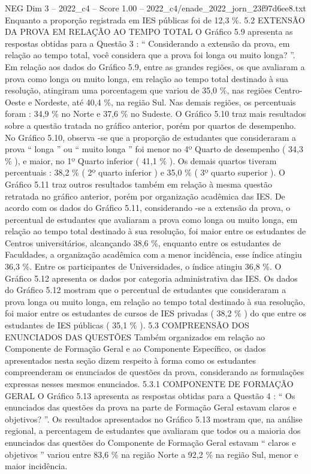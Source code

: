 \begin{textsample}{NEG Dim 3 – 2022\_c4 – Score 1.00 – 2022\_c4/enade\_2022\_jorn\_23f97d6ee8.txt}
Enquanto a proporção registrada em IES públicas foi de 12,3 \%. 5.2 EXTENSÃO DA PROVA EM RELAÇÃO AO TEMPO TOTAL O Gráfico 5.9 apresenta as respostas obtidas para a Questão 3 : “ Considerando a extensão da prova, em relação ao tempo total, você considera que a prova foi longa ou muito longa? ”.
Em relação aos dados do Gráfico 5.9, entre as grandes regiões, os que avaliaram a prova como longa ou muito longa, em relação ao tempo total destinado à sua resolução, atingiram uma porcentagem que variou de 35,0 \%, nas regiões Centro-Oeste e Nordeste, até 40,4 \%, na região Sul.
Nas demais regiões, os percentuais foram : 34,9 \% no Norte e 37,6 \% no Sudeste.
O Gráfico 5.10 traz mais resultados sobre a questão tratada no gráfico anterior, porém por quartos de desempenho.
No Gráfico 5.10, observa -se que a proporção de estudantes que consideraram a prova “ longa ” ou “ muito longa ” foi menor no 4º Quarto de desempenho ( 34,3 \% ), e maior, no 1º Quarto inferior ( 41,1 \% ).
Os demais quartos tiveram percentuais : 38,2 \% ( 2º quarto inferior ) e 35,0 \% ( 3º quarto superior ).
O Gráfico 5.11 traz outros resultados também em relação à mesma questão retratada no gráfico anterior, porém por organização acadêmica das IES.
De acordo com os dados do Gráfico 5.11, considerando -se a extensão da prova, o percentual de estudantes que avaliaram a prova como longa ou muito longa, em relação ao tempo total destinado à sua resolução, foi maior entre os estudantes de Centros universitários, alcançando 38,6 \%, enquanto entre os estudantes de Faculdades, a organização acadêmica com a menor incidência, esse índice atingiu 36,3 \%.
Entre os participantes de Universidades, o índice atingiu 36,8 \%.
O Gráfico 5.12 apresenta os dados por categoria administrativa das IES.
Os dados do Gráfico 5.12 mostram que o percentual de estudantes que consideraram a prova longa ou muito longa, em relação ao tempo total destinado à sua resolução, foi maior entre os estudantes de cursos de IES privadas ( 38,2 \% ) do que entre os estudantes de IES públicas ( 35,1 \% ). 5.3 COMPREENSÃO DOS ENUNCIADOS DAS QUESTÕES Também organizados em relação ao Componente de Formação Geral e ao Componente Específico, os dados apresentados nesta seção dizem respeito à forma como os estudantes compreenderam os enunciados de questões da prova, considerando as formulações expressas nesses mesmos enunciados. 5.3.1 COMPONENTE DE FORMAÇÃO GERAL O Gráfico 5.13 apresenta as respostas obtidas para a Questão 4 : “ Os enunciados das questões da prova na parte de Formação Geral estavam claros e objetivos? ”.
Os resultados apresentados no Gráfico 5.13 mostram que, na análise regional, a percentagem de estudantes que avaliaram que todos ou a maioria dos enunciados das questões do Componente de Formação Geral estavam “ claros e objetivos ” variou entre 83,6 \% na região Norte a 92,2 \% na região Sul, menor e maior incidência.

\end{textsample}
